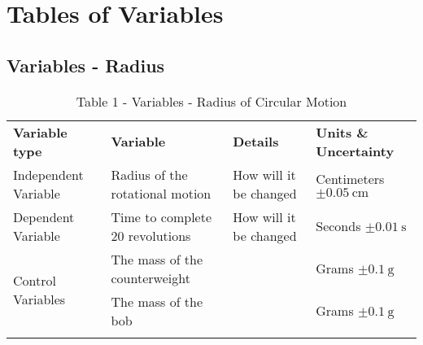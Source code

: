 \documentclass{lab}
\begin{document}
	\section{Tables of Variables}
	\centering
	\noindent\begin{minipage}{\textwidth}
	\subsection{Variables - Radius}
	\vspace{-0.2cm}
	\renewcommand{\arraystretch}{1.1}
        \begin{table}[H]
            \begin{tabular}{l|ll|l}
				\dtoprule
				\textbf{Variable type}					& \textbf{Variable}						& \textbf{Details}		 & \textbf{Units \& Uncertainty}	\\
				Independent Variable					& Radius of the rotational motion		& How will it be changed & Centimeters $\pm \SI{0.05}{\cm}$	\\
				Dependent Variable						& Time to complete 20 revolutions		& How will it be changed & Seconds $\pm \SI{0.01}{\second}$	\\
				\multirow{2}{*}{Control Variables}		& The mass of the counterweight			&						 & Grams $\pm \SI{0.1}{\gram}$		\\
														& The mass of the bob					&						 & Grams $\pm \SI{0.1}{\gram}$		\\
				\dbottomrule
	    \end{tabular}
	    \caption{Table 1 - Variables - Radius of Circular Motion}
	    \label{table: variables1}
	\end{table}
	\end{minipage}
\end{document}
